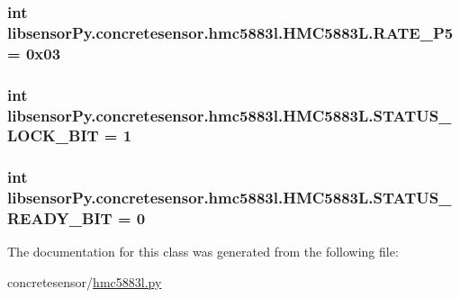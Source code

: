 \subsubsection[{R\+A\+T\+E\+\_\+7\+P5}]{\setlength{\rightskip}{0pt plus 5cm}int libsensor\+Py.\+concretesensor.\+hmc5883l.\+H\+M\+C5883\+L.\+R\+A\+T\+E\+\_\+P5 = 0x03\hspace{0.3cm}{\ttfamily [static]}}\label{classlibsensorPy_1_1concretesensor_1_1hmc5883l_1_1HMC5883L_a91d43af85e7e4b90aa8afac01d2558db}
\hypertarget{classlibsensorPy_1_1concretesensor_1_1hmc5883l_1_1HMC5883L_a76b463a75394a62ca025464bfd53a30a}{}
\subsubsection[{S\+T\+A\+T\+U\+S\+\_\+\+L\+O\+C\+K\+\_\+\+B\+I\+T}]{\setlength{\rightskip}{0pt plus 5cm}int libsensor\+Py.\+concretesensor.\+hmc5883l.\+H\+M\+C5883\+L.\+S\+T\+A\+T\+U\+S\+\_\+\+L\+O\+C\+K\+\_\+\+B\+I\+T = 1\hspace{0.3cm}{\ttfamily [static]}}\label{classlibsensorPy_1_1concretesensor_1_1hmc5883l_1_1HMC5883L_a76b463a75394a62ca025464bfd53a30a}
\hypertarget{classlibsensorPy_1_1concretesensor_1_1hmc5883l_1_1HMC5883L_a58909aeda669817aa37bd9d0b3c9300a}{}
\subsubsection[{S\+T\+A\+T\+U\+S\+\_\+\+R\+E\+A\+D\+Y\+\_\+\+B\+I\+T}]{\setlength{\rightskip}{0pt plus 5cm}int libsensor\+Py.\+concretesensor.\+hmc5883l.\+H\+M\+C5883\+L.\+S\+T\+A\+T\+U\+S\+\_\+\+R\+E\+A\+D\+Y\+\_\+\+B\+I\+T = 0\hspace{0.3cm}{\ttfamily [static]}}\label{classlibsensorPy_1_1concretesensor_1_1hmc5883l_1_1HMC5883L_a58909aeda669817aa37bd9d0b3c9300a}


The documentation for this class was generated from the following file\+:\begin{DoxyCompactItemize}
\item 
concretesensor/\hyperlink{concretesensor_2hmc5883l_8py}{hmc5883l.\+py}\end{DoxyCompactItemize}
